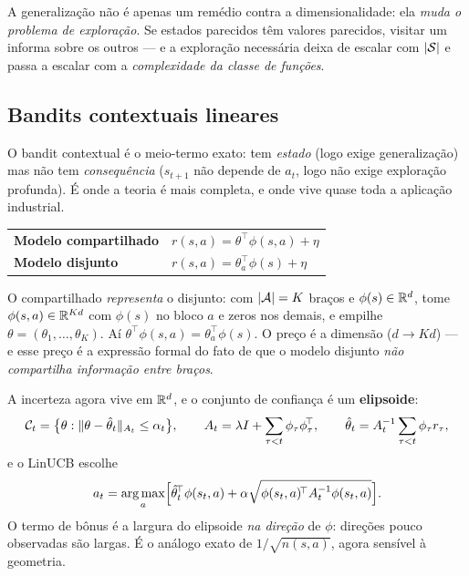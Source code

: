 \documentclass[11pt, a4paper]{article}
\newcommand{\feat}{\phi}
\begin{document}
\begin{ideiabox}
A generalização não é apenas um remédio contra a dimensionalidade: ela \emph{muda o
problema de exploração}. Se estados parecidos têm valores parecidos, visitar um informa
sobre os outros --- e a exploração necessária deixa de escalar com $\lvert\mathcal{S}\rvert$ e passa a
escalar com a \emph{complexidade da classe de funções}.
\end{ideiabox}

\subsection{Bandits contextuais lineares}

O bandit contextual é o meio-termo exato: tem \emph{estado} (logo exige generalização) mas
não tem \emph{consequência} ($s_{t+1}$ não depende de $a_t$, logo não exige exploração
profunda). É onde a teoria é mais completa, e onde vive quase toda a aplicação industrial.

\begin{center}\small
\begin{tabular}{@{}ll@{}}
\toprule
\textbf{Modelo compartilhado} & $r(s,a) = \theta^{\!\top}\feat(s,a) + \eta$ \\
\textbf{Modelo disjunto}      & $r(s,a) = \theta_a^{\!\top}\feat(s) + \eta$ \\
\bottomrule
\end{tabular}
\end{center}

O compartilhado \emph{representa} o disjunto: com $\lvert\mathcal{A}\rvert = K$ braços e
$\feat(s)\in\R^d$, tome $\feat(s,a)\in\R^{Kd}$ com $\feat(s)$ no bloco $a$ e zeros nos
demais, e empilhe $\theta = (\theta_1,\ldots,\theta_K)$. Aí
$\theta^{\!\top}\feat(s,a) = \theta_a^{\!\top}\feat(s)$. O preço é a dimensão
($d \to Kd$) --- e esse preço é a expressão formal do fato de que o modelo disjunto
\emph{não compartilha informação entre braços}.

A incerteza agora vive em $\mathbb{R}^d$, e o conjunto de confiança é um \textbf{elipsoide}:
\[
  \mathcal{C}_t = \bigl\{\theta : \norm{\theta - \hat\theta_t}_{A_t} \le \alpha_t\bigr\},
  \qquad
  A_t = \lambda I + \sum_{\tau<t}\feat_\tau\feat_\tau^{\!\top},
  \qquad
  \hat\theta_t = A_t^{-1}\sum_{\tau<t}\feat_\tau r_\tau ,
\]
e o LinUCB escolhe
\[
  a_t = \argmax_a\Bigl[\hat\theta_t^{\!\top}\feat(s_t,a)
        + \alpha\sqrt{\feat(s_t,a)^{\!\top}A_t^{-1}\feat(s_t,a)}\Bigr].
\]
O termo de bônus é a largura do elipsoide \emph{na direção} de $\feat$: direções pouco
observadas são largas. É o análogo exato de $1/\sqrt{n(s,a)}$, agora sensível à geometria.
\end{document}

